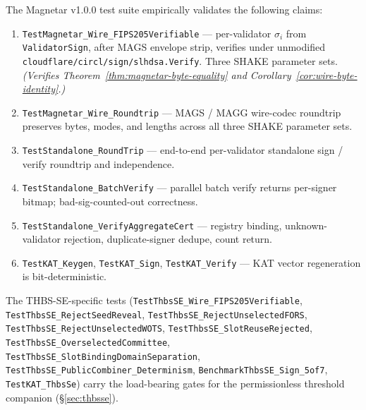 The Magnetar v1.0.0 test suite empirically validates the following
claims:
\begin{enumerate}[leftmargin=2em,nosep]
  \item \texttt{TestMagnetar\_Wire\_FIPS205Verifiable}
        --- per-validator $\sigma_i$ from \texttt{ValidatorSign},
        after MAGS envelope strip, verifies under unmodified
        \texttt{cloudflare/circl/sign/slhdsa.Verify}. Three
        SHAKE parameter sets. \emph{(Verifies
        Theorem~\ref{thm:magnetar-byte-equality} and
        Corollary~\ref{cor:wire-byte-identity}.)}
  \item \texttt{TestMagnetar\_Wire\_Roundtrip} --- MAGS / MAGG
        wire-codec roundtrip preserves bytes, modes, and lengths
        across all three SHAKE parameter sets.
  \item \texttt{TestStandalone\_RoundTrip} --- end-to-end
        per-validator standalone sign / verify roundtrip and
        independence.
  \item \texttt{TestStandalone\_BatchVerify} --- parallel batch
        verify returns per-signer bitmap; bad-sig-counted-out
        correctness.
  \item \texttt{TestStandalone\_VerifyAggregateCert} --- registry
        binding, unknown-validator rejection, duplicate-signer
        dedupe, count return.
  \item \texttt{TestKAT\_Keygen}, \texttt{TestKAT\_Sign},
        \texttt{TestKAT\_Verify} --- KAT vector regeneration is
        bit-deterministic.
\end{enumerate}

The THBS-SE-specific tests
(\texttt{TestThbsSE\_Wire\_FIPS205Verifiable},
\texttt{TestThbsSE\_RejectSeedReveal},
\texttt{TestThbsSE\_RejectUnselectedFORS},
\texttt{TestThbsSE\_RejectUnselectedWOTS},
\texttt{TestThbsSE\_SlotReuseRejected},
\texttt{TestThbsSE\_OverselectedCommittee},
\texttt{TestThbsSE\_SlotBindingDomainSeparation},
\texttt{TestThbsSE\_PublicCombiner\_Determinism},
\texttt{BenchmarkThbsSE\_Sign\_5of7},
\texttt{TestKAT\_ThbsSe}) carry the load-bearing gates for the
permissionless threshold companion (\S\ref{sec:thbsse}).

